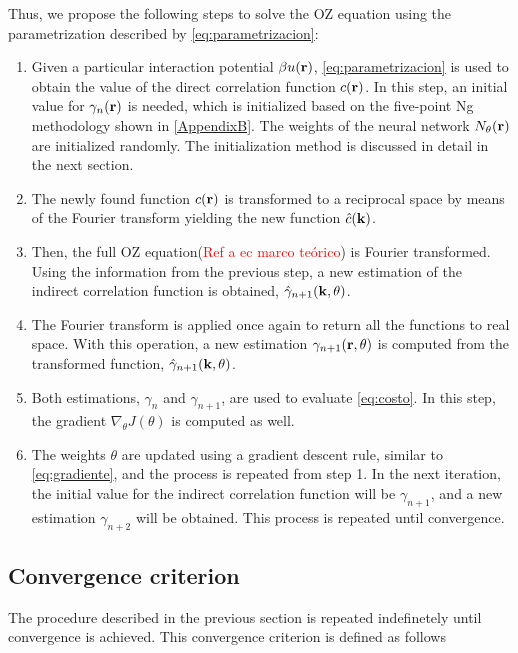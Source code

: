Thus, we propose the following steps to solve the OZ equation using the parametrization
described by \autoref{eq:parametrizacion}:

\begin{enumerate}
    \item Given a particular interaction potential $\beta u(\mathbf{r})$, \autoref{eq:parametrizacion} is used to obtain the value of the direct correlation function $c(\mathbf{r})$. In this step, an initial value for $\gamma_{n}(\mathbf{r})$ is needed, which is initialized based on the five-point Ng methodology shown in \autoref{AppendixB}. The weights of the neural network $N_{\theta}(\mathbf{r})$ are initialized randomly. The initialization method is discussed in detail in the next section.
    \item The newly found function $c(\mathbf{r})$ is transformed to a reciprocal space by means of the Fourier transform yielding the new function $\hat{c}(\mathbf{k})$.
    \item Then, the full OZ equation(\textcolor{red}{Ref a ec marco teórico}) is Fourier transformed. Using the information from the previous step, a new estimation of the indirect correlation function is obtained, $\hat{\gamma}_{n+1}(\mathbf{k}, \theta)$.
    \item The Fourier transform is applied once again to return all the functions to real space. With this operation, a new estimation $\gamma_{n+1}(\mathbf{r}, \theta)$ is computed from the transformed function, $\hat{\gamma}_{n+1}(\mathbf{k}, \theta)$.
    \item Both estimations, $\gamma_{n}$ and $\gamma_{n+1}$, are used to evaluate \autoref{eq:costo}. In this step, the gradient $\nabla_{\theta} J(\theta)$ is computed as well.
    \item The weights $\theta$ are updated using a gradient descent rule, similar to \autoref{eq:gradiente}, and the process is repeated from step 1. In the next iteration, the initial value for the indirect correlation function will be $\gamma_{n+1}$, and a new estimation $\gamma_{n+2}$ will be obtained. This process is repeated until convergence.
\end{enumerate}

\subsection{Convergence criterion}
The procedure described in the previous section is repeated indefinetely until convergence
is achieved. This convergence criterion is defined as follows

